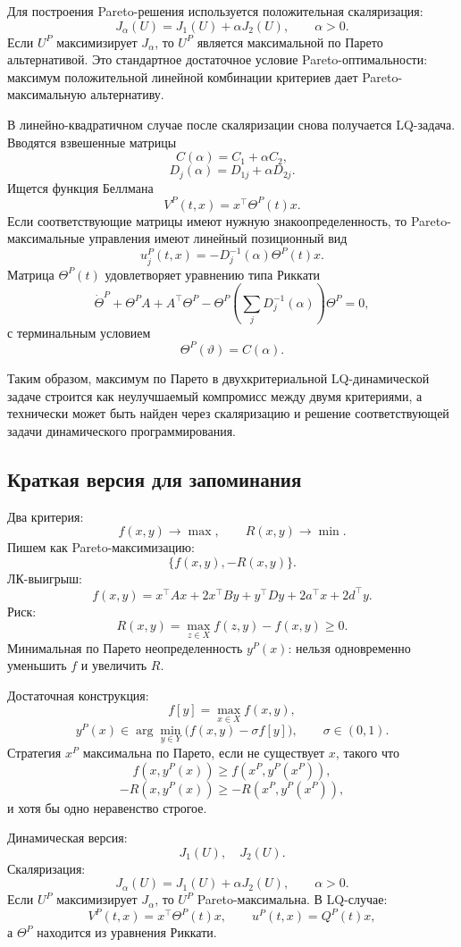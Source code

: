 \documentclass[12pt,a4paper]{article}
\newcommand{\memory}{\subsection*{Краткая версия для запоминания}}
\begin{document}
Для построения Pareto-решения используется положительная скаляризация:
\[
J_\alpha(U)=J_1(U)+\alpha J_2(U),
\qquad \alpha>0.
\]
Если \(U^P\) максимизирует \(J_\alpha\), то \(U^P\) является максимальной по Парето альтернативой. Это стандартное достаточное условие Pareto-оптимальности: максимум положительной линейной комбинации критериев дает Pareto-максимальную альтернативу.

В линейно-квадратичном случае после скаляризации снова получается LQ-задача. Вводятся взвешенные матрицы
\[
C(\alpha)=C_1+\alpha C_2,
\]
\[
D_j(\alpha)=D_{1j}+\alpha D_{2j}.
\]
Ищется функция Беллмана
\[
V^P(t,x)=x^{\top}\Theta^P(t)x.
\]
Если соответствующие матрицы имеют нужную знакоопределенность, то Pareto-максимальные управления имеют линейный позиционный вид
\[
u_j^P(t,x)=-D_j^{-1}(\alpha)\Theta^P(t)x.
\]
Матрица \(\Theta^P(t)\) удовлетворяет уравнению типа Риккати
\[
\dot\Theta^P+
\Theta^P A+A^{\top}\Theta^P-
\Theta^P\left(\sum_jD_j^{-1}(\alpha)\right)\Theta^P=0,
\]
с терминальным условием
\[
\Theta^P(\vartheta)=C(\alpha).
\]

Таким образом, максимум по Парето в двухкритериальной LQ-динамической задаче строится как неулучшаемый компромисс между двумя критериями, а технически может быть найден через скаляризацию и решение соответствующей задачи динамического программирования.

\memory
Два критерия:
\[
f(x,y)\to\max,
\qquad R(x,y)\to\min.
\]
Пишем как Pareto-максимизацию:
\[
\{f(x,y),-R(x,y)\}.
\]
ЛК-выигрыш:
\[
f(x,y)=x^{\top}Ax+2x^{\top}By+y^{\top}Dy+2a^{\top}x+2d^{\top}y.
\]
Риск:
\[
R(x,y)=\max_{z\in X}f(z,y)-f(x,y)\ge0.
\]
Минимальная по Парето неопределенность \(y^P(x)\): нельзя одновременно уменьшить \(f\) и увеличить \(R\).

Достаточная конструкция:
\[
f[y]=\max_{x\in X}f(x,y),
\]
\[
y^P(x)\in\arg\min_{y\in Y}\bigl(f(x,y)-\sigma f[y]\bigr),
\qquad \sigma\in(0,1).
\]
Стратегия \(x^P\) максимальна по Парето, если не существует \(x\), такого что
\[
f(x,y^P(x))\ge f(x^P,y^P(x^P)),
\]
\[
-R(x,y^P(x))\ge -R(x^P,y^P(x^P)),
\]
и хотя бы одно неравенство строгое.

Динамическая версия:
\[
J_1(U),\quad J_2(U).
\]
Скаляризация:
\[
J_\alpha(U)=J_1(U)+\alpha J_2(U),\qquad \alpha>0.
\]
Если \(U^P\) максимизирует \(J_\alpha\), то \(U^P\) Pareto-максимальна.
В LQ-случае:
\[
V^P(t,x)=x^{\top}\Theta^P(t)x,
\qquad u^P(t,x)=Q^P(t)x,
\]
а \(\Theta^P\) находится из уравнения Риккати.
\end{document}
